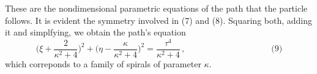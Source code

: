 \documentclass[12pt]{article}
\begin{document}
These are the nondimensional parametric equations of the path that the particle follows. It is evident the symmetry involved in (7) and (8). Squaring both, adding it and simplfying, we obtain the path's equation
\begin{equation*}
\Big(\xi+\frac{2}{\kappa^2+4}\Big)^2+\Big(\eta-\frac{\kappa}{\kappa^2+4}\Big)^2=
\frac{\tau^4}{\kappa^2+4}\,,\qquad\qquad\qquad\qquad\qquad\mbox{(9)}
\end{equation*}
which correponds to a family of spirals of parameter $\kappa$.




\end{document}

